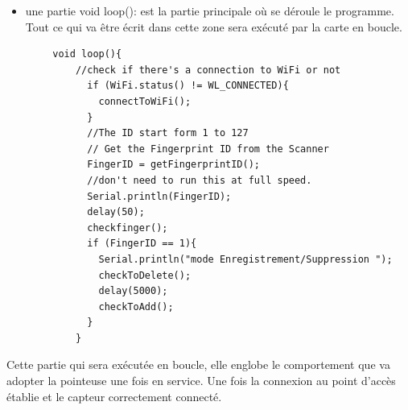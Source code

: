     \begin{itemize}
        \item [\textbullet] une partie void loop(): est la partie principale où se déroule le programme. Tout ce qui va être écrit dans cette zone sera exécuté par la carte en boucle. 
    \end{itemize}
    \begin{verbatim}
        void loop(){
            //check if there's a connection to WiFi or not
              if (WiFi.status() != WL_CONNECTED){
                connectToWiFi();
              }
              //The ID start form 1 to 127
              // Get the Fingerprint ID from the Scanner
              FingerID = getFingerprintID(); 
              //don't need to run this at full speed.
              Serial.println(FingerID);
              delay(50);
              checkfinger();
              if (FingerID == 1){
                Serial.println("mode Enregistrement/Suppression ");
                checkToDelete();
                delay(5000);
                checkToAdd();
              }
            }
    \end{verbatim}
   Cette partie qui sera exécutée en boucle, elle englobe le comportement que va adopter la pointeuse une fois en service. Une fois la connexion au point d’accès établie et le capteur correctement connecté. 
    
